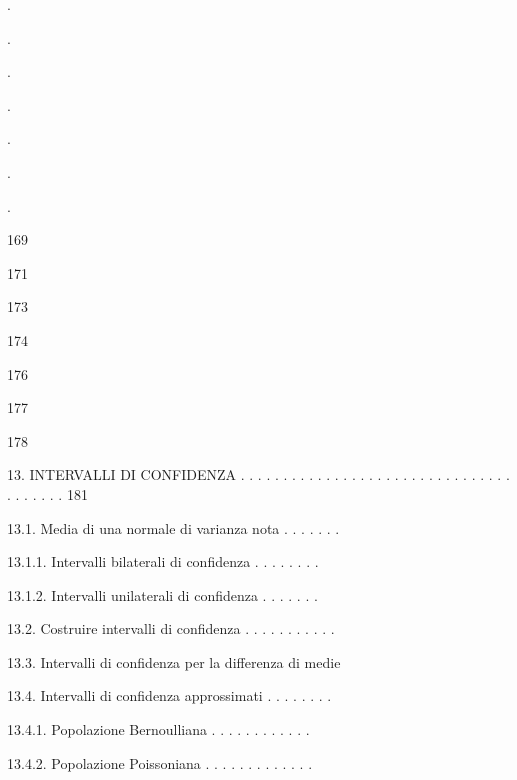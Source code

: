 \documentclass[a4paper,portrait,12pt]{article}
\begin{document}
.


.


.


.


.


.


.





169


171


173


174


176


177


178





\begin{flushleft}
13. INTERVALLI DI CONFIDENZA . . . . . . . . . . . . . . . . . . . . . . . . . . . . . . . . . . . . . . . 181
\end{flushleft}


\begin{flushleft}
13.1. Media di una normale di varianza nota . . . . . . .
\end{flushleft}


\begin{flushleft}
13.1.1. Intervalli bilaterali di confidenza . . . . . . . .
\end{flushleft}


\begin{flushleft}
13.1.2. Intervalli unilaterali di confidenza . . . . . . .
\end{flushleft}


\begin{flushleft}
13.2. Costruire intervalli di confidenza . . . . . . . . . . .
\end{flushleft}


\begin{flushleft}
13.3. Intervalli di confidenza per la differenza di medie
\end{flushleft}


\begin{flushleft}
13.4. Intervalli di confidenza approssimati . . . . . . . .
\end{flushleft}


\begin{flushleft}
13.4.1. Popolazione Bernoulliana . . . . . . . . . . . .
\end{flushleft}


\begin{flushleft}
13.4.2. Popolazione Poissoniana . . . . . . . . . . . . .
\end{flushleft}
\end{document}
